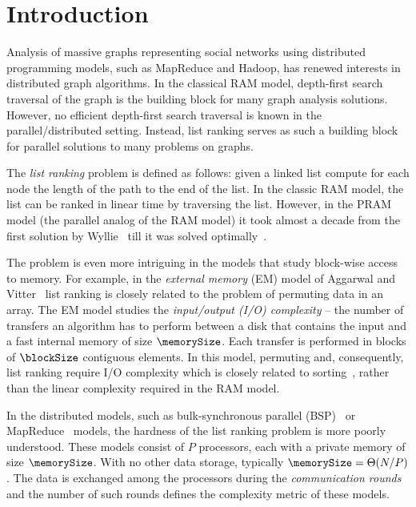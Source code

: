 \documentclass[envcountsame]{llncs}
\begin{document}
\section{Introduction}
\label{sectionIntroduction}
Analysis of massive graphs representing social networks using distributed programming models, such as MapReduce and Hadoop, has renewed interests in distributed graph algorithms. 
In the classical RAM model, depth-first search traversal of the graph is the building block for many graph analysis solutions. 
However, no efficient depth-first search traversal is known in the parallel/distributed setting. 
Instead, list ranking serves as such a building block for parallel solutions to many problems on graphs. 

The \emph{list ranking} problem is defined as follows: 
given a linked list compute for each node the length of the path to the end of the list.  
In the classic RAM model, the list can be ranked in linear time by traversing the list.
However, in the PRAM model (the parallel analog of the RAM model) it took almost a decade from the first solution by Wyllie~\cite{1979Wyllie} till it was solved optimally~\cite{1988AndersonMillerDetLR}. 


The problem is even more intriguing in the models that study block-wise access to memory. 
For example, in the \emph{external memory} (EM) model of Aggarwal and Vitter~\cite{1988AggarwalVitterEM} list ranking is closely related to the problem of permuting data in an array.
The EM model studies the {\em input/output (I/O) complexity} -- the number of transfers an algorithm has to perform between a disk that contains the input and a fast internal memory of size $\memorySize$.
Each transfer is performed in blocks of $\blockSize$ contiguous elements.  
In this model, permuting and, consequently, list ranking require I/O complexity which is closely related to sorting~\cite{1995ChiangExternalMemoryGraphAlgorithms}, rather than the linear complexity required in the RAM model.

In the distributed models, such as bulk-synchronous parallel (BSP)~\cite{1990ValiantBSP} or MapReduce~\cite{2008DeanMapReduce} models, the hardness of the list ranking problem is more poorly understood. These models consist of $P$ processors, each with a private memory of size $\memorySize$. With no other data storage, typically $\memorySize = \Theta(N/P)$. The data is exchanged among the processors during the \emph{communication rounds} and the number of such rounds defines the complexity metric of these models. 
\end{document}
